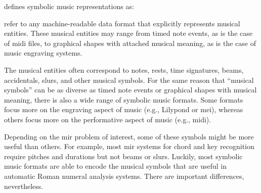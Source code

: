 

\textcite{muller2015music} defines symbolic music
representations as:

\begin{italicsquote}
 refer to any machine-readable
data format that explicitly represents musical entities.
These musical entities may range from timed note events, as
is the case of \gls{midi} ﬁles, to graphical shapes with
attached musical meaning, as is the case of music engraving
systems.
\end{italicsquote}


The musical entities often correspond to notes, rests, time
signatures, beams, accidentals, slurs, and other musical
symbols. For the same reason that ``musical symbols'' can be
as diverse as timed note events or graphical shapes with
musical meaning, there is also a wide range of symbolic
music formats. Some formats focus more on the engraving
aspect of music (e.g., Lilypond or \gls{mei}), whereas
others focus more on the performative aspect of music (e.g.,
\gls{midi}).

Depending on the \gls{mir} problem of interest, some of
these symbols might be more useful than others. For example,
most \gls{mir} systems for chord and key recognition require
pitches and durations but not beams or slurs. Luckily, most
symbolic music formats are able to encode the musical
symbols that are useful in automatic Roman numeral analysis
systems. There are important differences, nevertheless.
